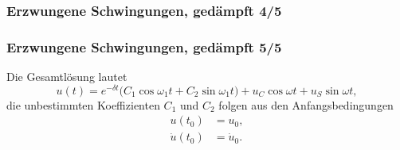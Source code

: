 \begin{frame}
\frametitle{Erzwungene Schwingungen, {\normalsize gedämpft 4/5}}




\end{frame}

\begin{frame}
\frametitle{Erzwungene Schwingungen, {\normalsize gedämpft 5/5}}
Die Gesamtlösung lautet
\begin{equation*}
 u(t)=e^{-\delta t}\bigl( C_1\cos\omega_1 t + C_2\sin\omega_1 t \bigr)
 +u_C\cos\omega t + u_S\sin\omega t,
\end{equation*}
die unbestimmten Koeffizienten $C_1$ und $C_2$ folgen aus den Anfangsbedingungen
\begin{align*}
 u(t_0)&=u_0,\\
 \dot{u}(t_0)&=\dot{u}_0.
\end{align*}
\end{frame}
